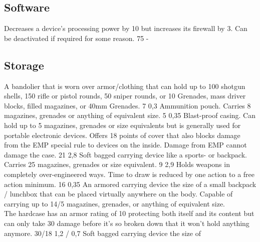 \pagebreak %
\subsection{Software}
\vspace{10mm}
\begin{multicols}{2}
    {Decreases a device's processing power by 10 but increases its firewall by 3.
        Can be deactivated if required for some reason.}
    {75}
    {-}
\end{multicols}

\subsection{Storage}
\vspace{10mm}
\begin{multicols}{2}
    {A bandolier that is worn over armor/clothing that can hold up to
        100 shotgun shells,
        150 rifle or pistol rounds,
        50 sniper rounds,
        or 10 Grenades, mass driver blocks, filled magazines, or 40mm Grenades.}
    {7}
    {0,3}
    {Ammunition pouch.
        Carries 8 magazines, grenades or anything of equivalent size.}
    {5}
    {0,35}
    {Blast-proof casing.
        Can hold up to 5 magazines, grenades or size equivalents
        but is generally used for portable electronic devices.
        Offers 18 points of cover that also blocks damage from the EMP special rule to devices on the inside.
        Damage from EMP cannot damage the case.}
    {21}
    {2,8}
    {Soft bagged carrying device like a sports- or backpack.
        Carries 25 magazines, grenades or size equivalent.}
    {9}
    {2,9}
    {Holds weapons in completely over-engineered ways.
        Time to draw is reduced by one action to a free action minimum.}
    {16}
    {0,35}
    {An armored carrying device the size of
        a small backpack / lunchbox that can be placed virtually anywhere on the body.
        Capable of carrying up to 14/5 magazines, grenades, or anything of equivalent size.\\
        The hardcase has an armor rating of 10 protecting
        both itself and its content
        but can only take 30 damage before it's so broken down
        that it won't hold anything anymore.}
    {30/18}
    {1,2 / 0,7}
    {Soft bagged carrying device the size of
}
\end{multicols}
